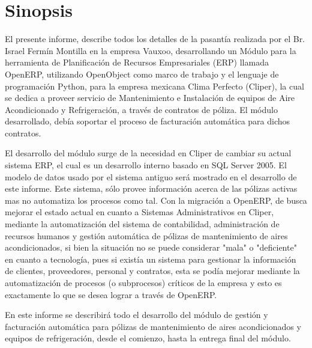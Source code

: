 \documentclass[a4paper, 12pt]{article}
\begin{document}
\tableofcontents

\newpage

\section{Sinopsis}
El presente informe, describe todos los detalles de la pasantía realizada por el Br. Israel Fermín Montilla en la empresa Vauxoo, desarrollando un Módulo para la herramienta de Planificación de Recursos Empresariales (ERP) llamada OpenERP, utilizando OpenObject como marco de trabajo y el lenguaje de programación Python, para la empresa mexicana Clima Perfecto (Cliper), la cual se dedica a proveer servicio de Mantenimiento e Instalación de equipos de Aire Acondicionado y Refrigeración, a través de contratos de póliza. El módulo desarrollado, debía soportar el proceso de facturación automática para dichos contratos.

El desarrollo del módulo surge de la necesidad en Cliper de cambiar su actual sistema ERP, el cual es un desarrollo interno basado en SQL Server 2005. El modelo de datos usado por el sistema antiguo será mostrado en el desarrollo de este informe. Este sistema, sólo provee información acerca de las pólizas activas mas no automatiza los procesos como tal. Con la migración a OpenERP, de busca mejorar el estado actual en cuanto a Sistemas Administrativos en Cliper, mediante la automatización del sistema de contabilidad, administración de recursos humanos y gestión automática de pólizas de mantenimiento de aires acondicionados, si bien la situación no se puede considerar "mala" o "deficiente" en cuanto a tecnología, pues si existía un sistema para gestionar la información de clientes, proveedores, personal y contratos, esta se podía mejorar mediante la automatización de procesos (o subprocesos) críticos de la empresa y esto es exactamente lo que se desea lograr a través de OpenERP.

En este informe se describirá todo el desarrollo del módulo de gestión y facturación automática para pólizas de mantenimiento de aires acondicionados y equipos de refrigeración, desde el comienzo, hasta la entrega final del módulo. 

\newpage
\end{document}
